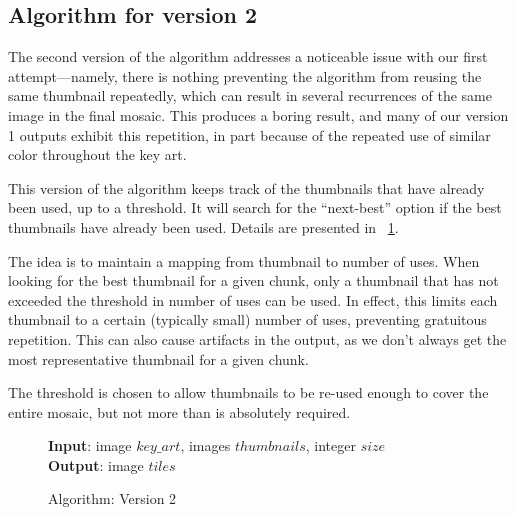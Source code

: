 \documentclass[11pt,conference]{IEEEtran}
\begin{document}
\subsection{Algorithm for version 2}\label{S:algv2}

The second version of the algorithm addresses a noticeable issue with our first
attempt---namely, there is nothing preventing the algorithm from reusing the
same thumbnail repeatedly, which can result in several recurrences of the same
image in the final mosaic. This produces a boring result, and many of our
version 1 outputs exhibit this repetition, in part because of the repeated use
of similar color throughout the key art.

This version of the algorithm keeps track of the thumbnails that have already
been used, up to a threshold. It will search for the ``next-best'' option if the
best thumbnails have already been used. Details are presented in
\figurename~\ref{alg:v2}.

The idea is to maintain a mapping from thumbnail to number of uses. When looking
for the best thumbnail for a given chunk, only a thumbnail that has not exceeded
the threshold in number of uses can be used. In effect, this limits each
thumbnail to a certain (typically small) number of uses, preventing gratuitous
repetition. This can also cause artifacts in the output, as we don't always get
the most representative thumbnail for a given chunk.

The threshold is chosen to allow thumbnails to be re-used enough to cover the
entire mosaic, but not more than is absolutely required.

\begin{figure}[!t]
    \textbf{Input}: image \(key\_art\), images \(thumbnails\), integer \(size\) \\
    \textbf{Output}: image \(tiles\)
    \begin{algorithmic}
        \ENDIF
            \ENDFOR
            \ENDWHILE
        \ENDFOR
    \end{algorithmic}
    \caption{Algorithm: Version 2}\label{alg:v2}
\end{figure}
\end{document}
